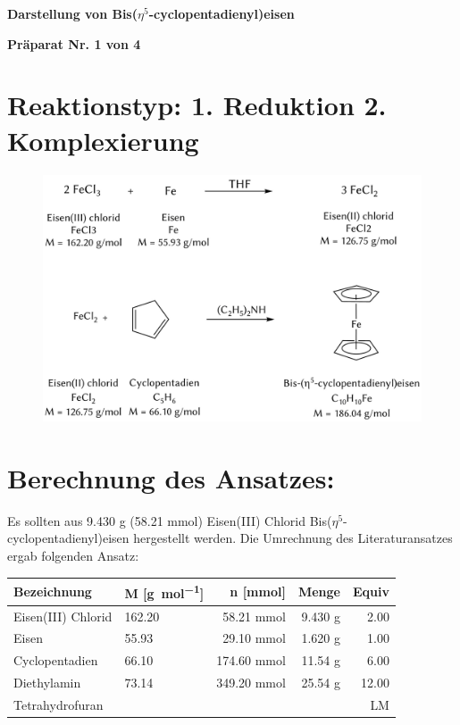 \documentclass[12pt]{article}
\begin{document}
\begin{onehalfspace}
  {\hfil  \textbf{\large Darstellung von Bis($\eta^5$-cyclopentadienyl)eisen}\hfil}
\par
  \vspace{1cm}
\hfil \textbf{Präparat Nr. 1 von 4 }\hfil
\section{Reaktionstyp: \textnormal{1. Reduktion 2. Komplexierung}  }
\begin{figure}[!ht]
   \centering
\includegraphics[width=\textwidth]{reaktion.png}
\end{figure}

\section{Berechnung des Ansatzes: }
Es sollten aus 9.430 g (58.21 \si{\milli\mol}) Eisen(III) Chlorid Bis($\eta^5$-cyclopentadienyl)eisen hergestellt werden.
Die Umrechnung des Literaturansatzes\cite{bio} ergab folgenden Ansatz:\\
\begin{tabular}{llrrr}
\toprule
\textbf{Bezeichnung} &\textbf{ M [\si{\gram\per\mol}]} & \textbf{n [\si{\milli\mol}]} & \textbf{Menge} & \textbf{Equiv}\\
\midrule
Eisen(III) Chlorid     & 162.20  & 58.21 \si{\milli\mol}  & 9.430 g  &  2.00  \\
Eisen        & 55.93   & 29.10 \si{\milli\mol}  & 1.620 g  &  1.00 \\
Cyclopentadien      & 66.10   & 174.60 \si{\milli\mol} & 11.54 \si{\gram} &  6.00 \\
Diethylamin & 73.14   & 349.20 \si{\milli\mol} & 25.54 \si{\gram} &  12.00\\
Tetrahydrofuran  &   &  &  &  LM\\
\bottomrule
\end{tabular}\\


\end{onehalfspace}
\end{document}

